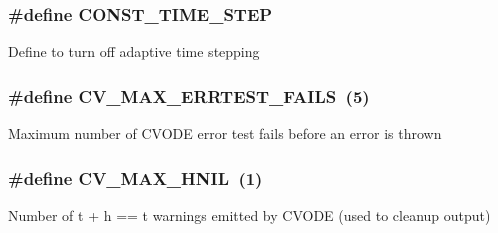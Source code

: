\subsubsection[{\texorpdfstring{C\+O\+N\+S\+T\+\_\+\+T\+I\+M\+E\+\_\+\+S\+T\+EP}{CONST_TIME_STEP}}]{\setlength{\rightskip}{0pt plus 5cm}\#define C\+O\+N\+S\+T\+\_\+\+T\+I\+M\+E\+\_\+\+S\+T\+EP}\hypertarget{solver__options_8cuh_a66c8290aad471b0be7768f635f03c349}{}\label{solver__options_8cuh_a66c8290aad471b0be7768f635f03c349}
Define to turn off adaptive time stepping 
\subsubsection[{\texorpdfstring{C\+V\+\_\+\+M\+A\+X\+\_\+\+E\+R\+R\+T\+E\+S\+T\+\_\+\+F\+A\+I\+LS}{CV_MAX_ERRTEST_FAILS}}]{\setlength{\rightskip}{0pt plus 5cm}\#define C\+V\+\_\+\+M\+A\+X\+\_\+\+E\+R\+R\+T\+E\+S\+T\+\_\+\+F\+A\+I\+LS~(5)}\hypertarget{solver__options_8cuh_ac42e0287ba619ab25b7d767a81f48082}{}\label{solver__options_8cuh_ac42e0287ba619ab25b7d767a81f48082}
Maximum number of C\+V\+O\+DE error test fails before an error is thrown 
\subsubsection[{\texorpdfstring{C\+V\+\_\+\+M\+A\+X\+\_\+\+H\+N\+IL}{CV_MAX_HNIL}}]{\setlength{\rightskip}{0pt plus 5cm}\#define C\+V\+\_\+\+M\+A\+X\+\_\+\+H\+N\+IL~(1)}\hypertarget{solver__options_8cuh_af45d9c410d5d7c99d2692080832d506e}{}\label{solver__options_8cuh_af45d9c410d5d7c99d2692080832d506e}
Number of t + h == t warnings emitted by C\+V\+O\+DE (used to cleanup output) 
